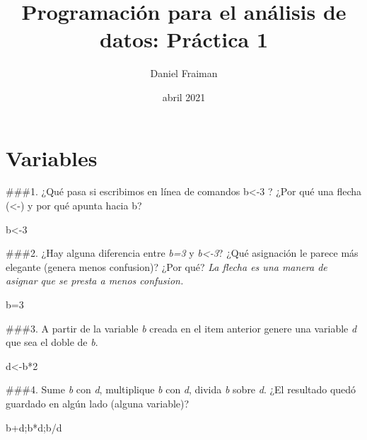 \documentclass[
]{article}
\title{Programación para el análisis de datos: Práctica 1}
\author{Daniel Fraiman}
\date{abril 2021}
\newenvironment{Shaded}{\begin{snugshade}}{\end{snugshade}}
\newcommand{\DecValTok}[1]{\textcolor[rgb]{0.00,0.00,0.81}{#1}}
\newcommand{\NormalTok}[1]{#1}
\newcommand{\OtherTok}[1]{\textcolor[rgb]{0.56,0.35,0.01}{#1}}
\newcommand{\SpecialCharTok}[1]{\textcolor[rgb]{0.00,0.00,0.00}{#1}}
\begin{document}
\maketitle

\hypertarget{variables}{%
\section{\texorpdfstring{\textbf{Variables}}{Variables}}\label{variables}}

\#\#\#1. ¿Qué pasa si escribimos en línea de comandos b\textless-3 ?
¿Por qué una flecha (\textless-) y por qué apunta hacia b?

\begin{Shaded}
\begin{Highlighting}[]
\NormalTok{b}\OtherTok{\textless{}{-}}\DecValTok{3}
\end{Highlighting}
\end{Shaded}

\#\#\#2. ¿Hay alguna diferencia entre \emph{b=3} y \emph{b\textless-3}?
¿Qué asignación le parece más elegante (genera menos confusion)? ¿Por
qué?
\textit{La flecha es una manera de asignar que se presta a menos confusion.}

\begin{Shaded}
\begin{Highlighting}[]
\NormalTok{b}\OtherTok{=}\DecValTok{3}
\end{Highlighting}
\end{Shaded}

\#\#\#3. A partir de la variable \emph{b} creada en el item anterior
genere una variable \emph{d} que sea el doble de \emph{b}.

\begin{Shaded}
\begin{Highlighting}[]
\NormalTok{d}\OtherTok{\textless{}{-}}\NormalTok{b}\SpecialCharTok{*}\DecValTok{2}
\end{Highlighting}
\end{Shaded}

\#\#\#4. Sume \emph{b} con \emph{d}, multiplique \emph{b} con \emph{d},
divida \emph{b} sobre \emph{d}. ¿El resultado quedó guardado en algún
lado (alguna variable)?

\begin{Shaded}
\begin{Highlighting}[]
\NormalTok{b}\SpecialCharTok{+}\NormalTok{d;b}\SpecialCharTok{*}\NormalTok{d;b}\SpecialCharTok{/}\NormalTok{d}
\end{Highlighting}
\end{Shaded}
\end{document}
